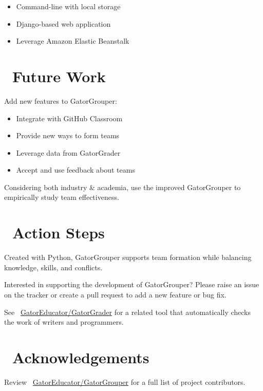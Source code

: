 \documentclass[a0paper,fleqn]{betterposter}
\begin{document}
{\begin{itemize}[leftmargin=*]
    \item{Command-line with local storage}
    \item{Django-based web application}
    \item{Leverage Amazon Elastic Beanstalk}

  \end{itemize}

  \section{\faDashboard~Future Work}
  Add new features to GatorGrouper: \\
  \vspace*{-.5in}

  \begin{itemize}[leftmargin=*]

    \item{Integrate with GitHub Classroom}
    \item{Provide new ways to form teams}
    \item{Leverage data from GatorGrader}
    \item{Accept and use feedback about teams}

  \end{itemize}

  \vspace{.5em}
  Considering both industry \& academia, use the improved GatorGrouper to
  empirically study team effectiveness.

  \section{\faRocket~Action Steps}
  Created with Python, GatorGrouper supports team formation while balancing
  knowledge, skills, and conflicts.

  \vspace*{.25in}
  Interested in supporting the development of GatorGrouper? Please raise an
  issue on the tracker or create a pull request to add a new feature or bug
  fix.

  \vspace*{.25in}
  See \faGithubAlt~\underline{GatorEducator/GatorGrader} for a related tool that
  automatically checks the work of writers and programmers.

  \section{\faThumbsOUp~Acknowledgements}
  Review \faGithubAlt~\underline{GatorEducator/GatorGrouper} for a full list of
  project contributors.

}
\end{document}
